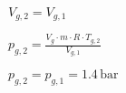\( V_{g,2} = V_{g,1} \)  

\( p_{g,2} = \frac{V_{g} \cdot m \cdot R \cdot T_{g,2}}{V_{g,1}} \)  

\( p_{g,2} = p_{g,1} = 1.4 \, \text{bar} \)